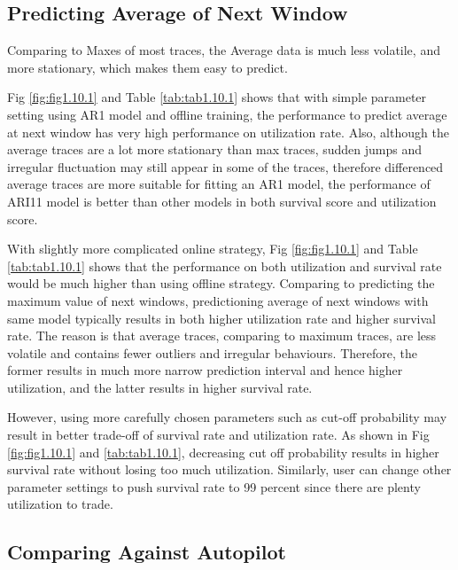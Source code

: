 \documentclass{article}
\begin{document}
\subsection{Predicting Average of Next Window}

\begin{flushleft}
Comparing to Maxes of most traces, the Average data is much less volatile, and
more stationary, which makes them easy to predict.

Fig \ref{fig:fig1.10.1} and Table \ref{tab:tab1.10.1} shows that with simple
parameter setting using AR1 model and offline training, the performance to
predict average at next window has very high performance on utilization rate.
Also, although the average traces are a lot more stationary than max traces,
sudden jumps and irregular fluctuation may still appear in some of the traces,
therefore differenced average traces are more suitable for fitting an AR1 model,
the performance of ARI11 model is better than other models in both survival
score and utilization score.

With slightly more complicated online strategy, Fig \ref{fig:fig1.10.1} and
Table \ref{tab:tab1.10.1} shows that the performance on both utilization and
survival rate would be much higher than using offline strategy. Comparing to
predicting the maximum value of next windows, predictioning average of next
windows with same model typically results in both higher utilization rate and
higher survival rate. The reason is that average traces, comparing to maximum
traces, are less volatile and contains fewer outliers and irregular behaviours.
Therefore, the former results in much more narrow prediction interval and hence
higher utilization, and the latter results in higher survival rate.

However, using more carefully chosen parameters such as cut-off probability may
result in better trade-off of survival rate and utilization rate. As shown in
Fig \ref{fig:fig1.10.1} and \ref{tab:tab1.10.1}, decreasing cut off probability
results in higher survival rate without losing too much utilization. Similarly,
user can change other parameter settings to push survival rate to 99 percent
since there are plenty utilization to trade.
\end{flushleft}

\subsection{Comparing Against Autopilot}
\end{document}
